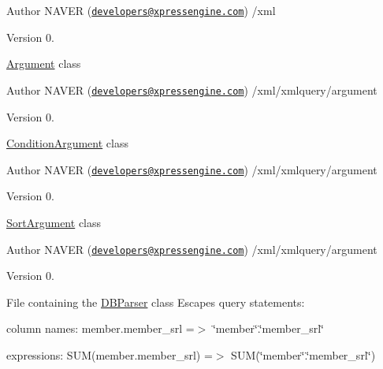 \begin{DoxyAuthor}{Author}
N\+A\+V\+E\+R (\href{mailto:developers@xpressengine.com}{\tt developers@xpressengine.\+com}) /xml 
\end{DoxyAuthor}
\begin{DoxyVersion}{Version}
0.
\end{DoxyVersion}
\hyperlink{classArgument}{Argument} class \begin{DoxyAuthor}{Author}
N\+A\+V\+E\+R (\href{mailto:developers@xpressengine.com}{\tt developers@xpressengine.\+com}) /xml/xmlquery/argument 
\end{DoxyAuthor}
\begin{DoxyVersion}{Version}
0.
\end{DoxyVersion}
\hyperlink{classConditionArgument}{Condition\+Argument} class \begin{DoxyAuthor}{Author}
N\+A\+V\+E\+R (\href{mailto:developers@xpressengine.com}{\tt developers@xpressengine.\+com}) /xml/xmlquery/argument 
\end{DoxyAuthor}
\begin{DoxyVersion}{Version}
0.
\end{DoxyVersion}
\hyperlink{classSortArgument}{Sort\+Argument} class \begin{DoxyAuthor}{Author}
N\+A\+V\+E\+R (\href{mailto:developers@xpressengine.com}{\tt developers@xpressengine.\+com}) /xml/xmlquery/argument 
\end{DoxyAuthor}
\begin{DoxyVersion}{Version}
0.
\end{DoxyVersion}
File containing the \hyperlink{classDBParser}{D\+B\+Parser} class Escapes query statements\+: ~\newline

\begin{DoxyItemize}
\item column names\+: member.\+member\+\_\+srl =$>$ \char`\"{}member\char`\"{}.\char`\"{}member\+\_\+srl\char`\"{} ~\newline

\item expressions\+: S\+U\+M(member.\+member\+\_\+srl) =$>$ S\+U\+M(\char`\"{}member\char`\"{}.\char`\"{}member\+\_\+srl\char`\"{}) ~\newline

\end{DoxyItemize}


